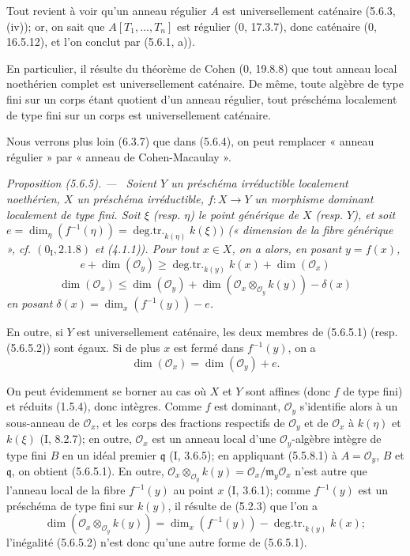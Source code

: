 \documentclass[10pt,oneside]{book}
\makeatletter
\newenvironment{proposition}[1][]{%
  \par\medskip\noindent\itshape Proposition (#1). ---\ }{\par}
\newcommand{\EGAReaderTarget}[2]{\hypertarget{#1}{}\@bsphack\begingroup\def\@currentHref{#1}\label{#2}\endgroup\@esphack}
\makeatother
\begin{document}
Tout revient à voir qu'un anneau régulier $A$ est universellement caténaire
(5.6.3, (iv)); or, on sait que $A[T_1,\ldots,T_n]$ est régulier (0, 17.3.7),
donc caténaire (0, 16.5.12), et l'on conclut par (5.6.1, a)).

En particulier, il résulte du théorème de Cohen (0, 19.8.8) que tout anneau
local noethérien complet est universellement caténaire. De même, toute
algèbre de type fini sur un corps étant quotient d'un anneau régulier, tout
préschéma localement de type fini sur un corps est universellement caténaire.

Nous verrons plus loin (6.3.7) que dans (5.6.4), on peut remplacer « anneau
régulier » par « anneau de Cohen-Macaulay ».

\begin{proposition}[5.6.5]
\EGAReaderTarget{ega4.c04.prop.5-6-5}{IV.2.s5.6.5-fr}
Soient $Y$ un préschéma irréductible localement noethérien, $X$ un préschéma
irréductible, $f:X\to Y$ un morphisme dominant localement de type fini. Soit
$\xi$ (resp. $\eta$) le point générique de $X$ (resp. $Y$), et soit
$e=\dim_\eta(f^{-1}(\eta))=\operatorname{deg.tr.}_{k(\eta)}k(\xi))$
(« dimension de la fibre générique », cf. $(0_{\mathrm I},2.1.8)$ et
(4.1.1)). Pour tout $x\in X$, on a alors, en posant $y=f(x)$,
\begin{equation}
e+\dim(\mathcal O_y)
\geq\operatorname{deg.tr.}_{k(y)}k(x)+\dim(\mathcal O_x)
\tag{5.6.5.1}\label{IV.2.s5.6.5.1-fr}
\end{equation}
\begin{equation}
\dim(\mathcal O_x)
\leq\dim(\mathcal O_y)
+\dim(\mathcal O_x\otimes_{\mathcal O_y}k(y))-\delta(x)
\tag{5.6.5.2}\label{IV.2.s5.6.5.2-fr}
\end{equation}
en posant $\delta(x)=\dim_x(f^{-1}(y))-e$.

En outre, si $Y$ est universellement caténaire, les deux membres de
(5.6.5.1) (resp. (5.6.5.2)) sont égaux. Si de plus $x$ est fermé dans
$f^{-1}(y)$, on a
\begin{equation}
\dim(\mathcal O_x)=\dim(\mathcal O_y)+e.
\tag{5.6.5.3}\label{IV.2.s5.6.5.3-fr}
\end{equation}
\end{proposition}

On peut évidemment se borner au cas où $X$ et $Y$ sont affines (donc $f$ de
type fini) et réduits (1.5.4), donc intègres. Comme $f$ est dominant,
$\mathcal O_y$ s'identifie alors à un sous-anneau de $\mathcal O_x$, et les
corps des fractions respectifs de $\mathcal O_y$ et de $\mathcal O_x$ à
$k(\eta)$ et $k(\xi)$ (I, 8.2.7); en outre, $\mathcal O_x$ est un anneau
local d'une $\mathcal O_y$-algèbre intègre de type fini $B$ en un idéal
premier $\mathfrak q$ (I, 3.6.5); en appliquant (5.5.8.1) à
$A=\mathcal O_y$, $B$ et $\mathfrak q$, on obtient (5.6.5.1). En outre,
$\mathcal O_x\otimes_{\mathcal O_y}k(y)=\mathcal O_x/\mathfrak m_y\mathcal O_x$
n'est autre que l'anneau local de la fibre $f^{-1}(y)$ au point $x$
(I, 3.6.1); comme $f^{-1}(y)$ est un préschéma de type fini sur $k(y)$, il
résulte de (5.2.3) que l'on a
\[
\dim(\mathcal O_x\otimes_{\mathcal O_y}k(y))
=\dim_x(f^{-1}(y))-\operatorname{deg.tr.}_{k(y)}k(x);
\]
l'inégalité (5.6.5.2) n'est donc qu'une autre forme de (5.6.5.1).
\end{document}
